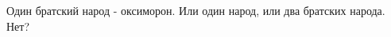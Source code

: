 \begin{itemize}
 

Один братский народ - оксиморон. Или один народ, или два братских народа. Нет?

\end{itemize}

